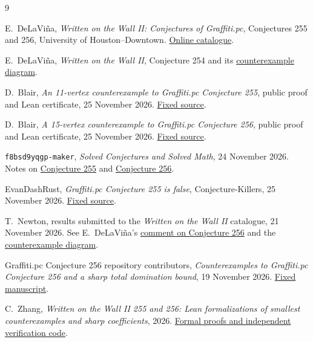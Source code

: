 \documentclass[11pt]{article}
\newcommand{\repobase}{https://github.com/burgerge/wowii255-total-domination}
\newcommand{\catalogue}{https://www.uhd.edu/academics/sciences/mathematics-statistics/wowii/index.html}
\begin{document}
\begingroup
\small
\begin{thebibliography}{9}

E.~DeLaVi\~na,
\emph{Written on the Wall II: Conjectures of Graffiti.pc},
Conjectures 255 and 256, University of Houston--Downtown.
\href{\catalogue}{Online catalogue}.

E.~DeLaVi\~na,
\emph{Written on the Wall II}, Conjecture 254 and its
\href{https://www.uhd.edu/academics/sciences/mathematics-statistics/wowii/files/cedalm254.jpg}{counterexample diagram}.

D.~Blair, \emph{An 11-vertex counterexample to Graffiti.pc
Conjecture 255}, public proof and Lean certificate, 25 November 2026.
\href{https://github.com/derekblair/math-proofs/blob/af6904cc3fa537b5c4dcea9561b24b69177c6ee1/research/lean-verified-2026-11-25/graffiti-255/PROOF255.md}{Fixed source}.

D.~Blair, \emph{A 15-vertex counterexample to Graffiti.pc
Conjecture 256}, public proof and Lean certificate, 25 November 2026.
\href{https://github.com/derekblair/math-proofs/blob/af6904cc3fa537b5c4dcea9561b24b69177c6ee1/research/lean-verified-2026-11-25/graffiti-256/PROOF.md}{Fixed source}.

\texttt{f8bsd9yqgp-maker}, \emph{Solved Conjectures and Solved Math},
24 November 2026. Notes on
\href{https://github.com/f8bsd9yqgp-maker/Solved-conjectures-/blob/9a49179c1217e4e260e24b9d5d506432d1b328eb/proofs/graffiti-pc-255/README.md}{Conjecture 255}
and
\href{https://github.com/f8bsd9yqgp-maker/Solved-conjectures-/blob/9a49179c1217e4e260e24b9d5d506432d1b328eb/proofs/graffiti-pc-256/README.md}{Conjecture 256}.

EvanDashRust, \emph{Graffiti.pc Conjecture 255 is false},
Conjecture-Killers, 25 November 2026.
\href{https://github.com/EvanDashRust/Conjecture-Killers/blob/1c777ae198b5a9fcddc69968232d0eddd4138f80/Results/Graffiti255/README.md}{Fixed source}.

T.~Newton, results submitted to the \emph{Written on the Wall II}
catalogue, 21 November 2026. See E.~DeLaVi\~na's
\href{https://www.uhd.edu/academics/sciences/mathematics-statistics/wowii/files/comments.json}{comment on Conjecture 256}
and the
\href{https://www.uhd.edu/academics/sciences/mathematics-statistics/wowii/files/ce256.png}{counterexample diagram}.

Graffiti.pc Conjecture 256 repository contributors,
\emph{Counterexamples to Graffiti.pc Conjecture 256 and a sharp total
domination bound}, 19 November 2026.
\href{https://github.com/srikant07-dev/graffiti-pc-conjecture-256/blob/314f74a234703f3860327586054c9fa9e08e45e7/paper.pdf}{Fixed manuscript}.

C.~Zhang, \emph{Written on the Wall II 255 and 256:
Lean formalizations of smallest counterexamples and sharp coefficients},
2026. \href{\repobase/tree/67878cbe235830fc174bb13c0d03b77d104742f5}{Formal proofs
and independent verification code}.

\end{thebibliography}
\endgroup
\end{document}
